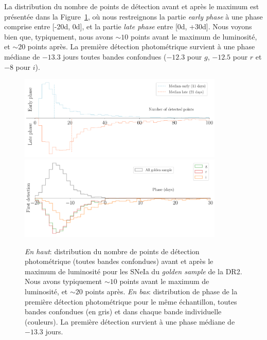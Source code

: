 \documentclass[../main/main.tex]{subfiles}
\begin{document}
La distribution du nombre de points de détection avant et après le
maximum est présentée dans la Figure~\ref{fig:earlylatephase}, où nous
restreignons la partie \textit{early phase} à une phase comprise entre
[-20d, 0d], et la partie \textit{late phase} entre [0d, +30d]. Nous
voyons bien que, typiquement, nous avons $\sim10$ points avant le
maximum de luminosité, et $\sim20$ points après. La première détection
photométrique survient à une phase médiane de $-13.3$ jours toutes bandes
confondues ($-12.3$ pour $g$, $-12.5$ pour $r$ et $-8$ pour $i$).
\begin{figure}[ht!]
  \centering
  \includegraphics[width=0.87\textwidth]{../figures/09_dr2/early_late_phase_dr2.pdf}
  \includegraphics[width=0.87\textwidth]{../figures/09_dr2/first_detect_dr2.pdf}
  \caption[Distribution de points de détection avant/après le maximum de
  luminosité et distribution de phase de la première détection du
  \textit{golden sample} de la DR2.]{\emph{En haut}: distribution du
    nombre de
    points de détection photométrique (toutes bandes confondues) avant et après le maximum de
  luminosité pour les SNeIa du
  \textit{golden sample} de la DR2. Nous avons typiquement $\sim10$ points avant le
maximum de luminosité, et $\sim20$ points après. \emph{En bas}:
distribution de phase de la première détection photométrique pour le
même échantillon, toutes bandes confondues (en gris) et dans chaque
bande individuelle (couleurs). La première détection survient à une phase médiane de $-13.3$ jours.}
  \label{fig:earlylatephase}
\end{figure}
\end{document}
